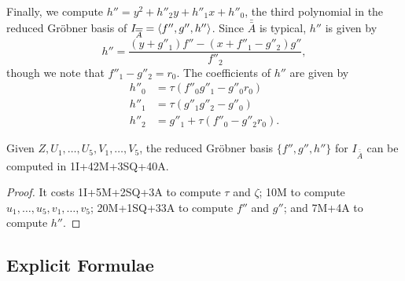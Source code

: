 \begin{comment}
\begin{align*}
  G_3 &= u_5 \\
  f''_2 &= u_5(u_5 - c_8) + u_4 - v_5 \\
  G_2 &= v_4 + v_5(u_5 - c_8) + \tau(u_5(u_5(u_3 - c_6) + v_5(u_4 - c_7) + c_5 - v_3) + v_5(u_3 - v_4) - u_2) \\
  e_3 &= f''_2v_5 - G_2u_5 \\
  f''_1 &= u_5(u_4 - c_7) + G_2 + u_3 - v_4 \\
  G_1 &= u_5(c_6 - u_3) - e_3 + v_3 \\
  f''_0 &= c_7e_3 + u_5(u_2 - c_4) + G_2u_3 + G_1u_4 - f''_2v_3 - f''_1v_4 + u_1 - v_2 \\
  G_0 &= -c_6e_3 + u_5(c_3 - u_1) - G_1u_3 + f''_1v_3 + v_1.
\end{align*}
\end{comment}

Finally, we compute $h'' = y^2 + h''_2y + h''_1x + h''_0$,
the third polynomial in the reduced Gr\"obner basis of $I_{\overline{\overline A}} = \left\langle f'', g'', h'' \right\rangle$.
Since $\bar{\bar A}$ is typical, $h''$ is given by
\[ h'' = \frac {(y + g''_1)f'' - (x + f''_1 - g''_2)g''} {f''_2}, \]
though we note that $f''_1 - g''_2 = r_0$.
The coefficients of $h''$ are given by
\begin{align*}
  h''_0 &= \tau(f''_0g''_1 - g''_0r_0) \\
  h''_1 &= \tau(g''_1g''_2 - g''_0) \\
  h''_2 &= g''_1 + \tau(f''_0 - g''_2r_0).
\end{align*}

\begin{lemma}
  \label{lem_fgh_op_count}
  Given $Z, U_1, \ldots, U_5, V_1, \ldots, V_5$,
  the reduced Gr\"obner basis $\{f'',g'',h''\}$ for $I_{\bar{\bar A}}$ can be computed in 1I+42M+3SQ+40A.
\end{lemma}
\begin{proof}
  It costs 1I+5M+2SQ+3A to compute $\tau$ and $\zeta$;
  10M to compute $u_1, \ldots, u_5, v_1, \ldots, v_5$;
  20M+1SQ+33A to compute $f''$ and $g''$; and
  7M+4A to compute $h''$.
\end{proof}



\subsection{Explicit Formulae}

